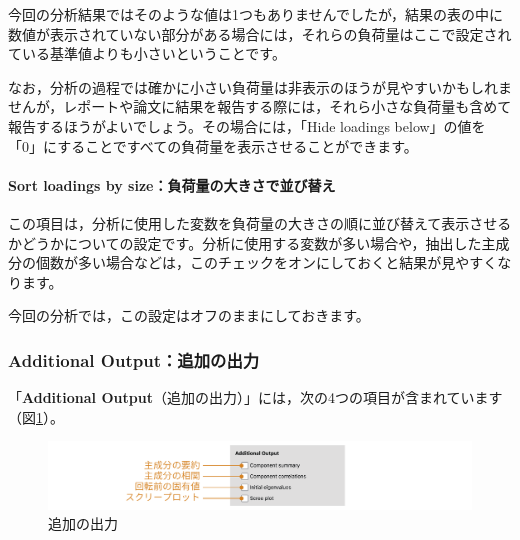 \documentclass[
  12pt,
  a5jpaper,
  lualatex, ja=standard]{bxjsbook}
\begin{document}
今回の分析結果ではそのような値は1つもありませんでしたが，結果の表の中に数値が表示されていない部分がある場合には，それらの負荷量はここで設定されている基準値よりも小さいということです。

なお，分析の過程では確かに小さい負荷量は非表示のほうが見やすいかもしれませんが，レポートや論文に結果を報告する際には，それら小さな負荷量も含めて報告するほうがよいでしょう。その場合には，「Hide loadings below」の値を「0」にすることですべての負荷量を表示させることができます。

\hypertarget{sort-loadings-by-sizeux8ca0ux8377ux91cfux306eux5927ux304dux3055ux3067ux4e26ux3073ux66ffux3048}{%
\paragraph*{Sort loadings by size：負荷量の大きさで並び替え}\label{sort-loadings-by-sizeux8ca0ux8377ux91cfux306eux5927ux304dux3055ux3067ux4e26ux3073ux66ffux3048}}

この項目は，分析に使用した変数を負荷量の大きさの順に並び替えて表示させるかどうかについての設定です。分析に使用する変数が多い場合や，抽出した主成分の個数が多い場合などは，このチェックをオンにしておくと結果が見やすくなります。

今回の分析では，この設定はオフのままにしておきます。

\hypertarget{sub:factor-pca-additional}{%
\subsubsection*{Additional Output：追加の出力}\label{sub:factor-pca-additional}}

「\textbf{Additional Output}（追加の出力）」には，次の4つの項目が含まれています（図\ref{fig:factor-pca-additional}）。

\begin{figure}[!ht]

{\centering \includegraphics[width=1\linewidth]{images/factor/pca-additional} 

}

\caption{追加の出力}\label{fig:factor-pca-additional}
\end{figure}
\end{document}
